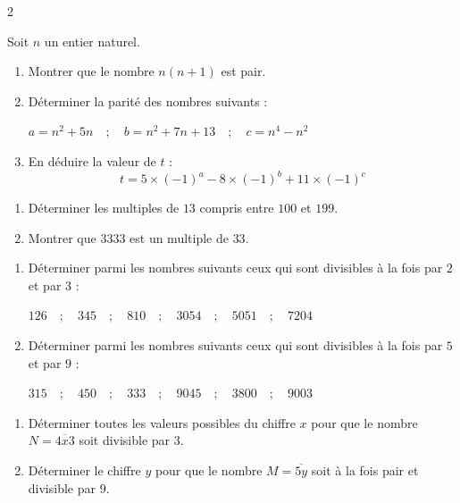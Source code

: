 \documentclass[10pt, a4paper]{article}
\begin{document}
\begin{multicols*}{2}
\begin{Application}[][15 min]
Soit $n$ un entier naturel.
\begin{enumerate}[leftmargin=*,itemsep=0.5pt]
    \item Montrer que le nombre $n(n+1)$ est pair.
    \item Déterminer la parité des nombres suivants :
\begin{center}
$a=n^2+5n \quad ; \quad b=n^2+7n+13 \quad ; \quad c=n^4-n^2$
\end{center}
\item En déduire la valeur de $t$ :
\[  t=5\times(-1)^a-8\times(-1)^b+11\times(-1)^c \]
\end{enumerate}
\end{Application}


\begin{Application}[][15 min]
\begin{enumerate}[leftmargin=*,itemsep=0.5pt]
    \item Déterminer les multiples de $13$ compris entre $100$ et $199$.
    \item Montrer que $3333$ est un multiple de $33$.
\end{enumerate}
\end{Application}

\begin{Application}[][15 min]
\begin{enumerate}[leftmargin=*,itemsep=0.5pt]
    \item Déterminer parmi les nombres suivants ceux qui sont divisibles à la fois par $2$ et par $3$ :
\begin{center}
    $126 \quad ; \quad 345 \quad ; \quad 810 \quad ; \quad 3054 \quad ; \quad 5051 \quad ; \quad 7204$
\end{center}
    \item Déterminer parmi les nombres suivants ceux qui sont divisibles à la fois par $5$ et par $9$ :
\begin{center}
    $315 \quad ; \quad 450 \quad ; \quad 333 \quad ; \quad 9045 \quad ; \quad 3800 \quad ; \quad 9003$
\end{center}
\end{enumerate}
\end{Application}

\begin{Application}[][15 min]
\begin{enumerate}[leftmargin=*,itemsep=0.5pt]
    \item Déterminer toutes les valeurs possibles du chiffre $x$ pour que le nombre $N = \overline{4x3}$ soit divisible par $3$.
    \item Déterminer le chiffre $y$ pour que le nombre $M = \overline{5y}$ soit à la fois pair et divisible par $9$.
\end{enumerate}
\end{Application}




\end{multicols*}
\end{document}
